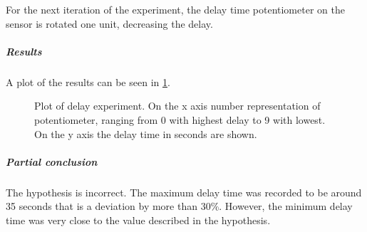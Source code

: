 For the next iteration of the experiment, the delay time potentiometer on the sensor
is rotated one unit, decreasing the delay.

\subparagraph{Results}

A plot of the results can be seen in \cref{fig:pir_delay}.

\begin{figure}[htbp]
\centering
{}
\caption[Delay experiment]{Plot of delay experiment. On the x axis number representation of potentiometer, ranging from 0 with highest delay to 9 with lowest. On the y axis the delay time in seconds are shown.}\label{fig:pir_delay}
\end{figure}

\subparagraph{Partial conclusion}

The hypothesis is incorrect. The maximum delay time was recorded to be
around 35 seconds that is a deviation by more than 30\%.
However, the minimum delay time was very close to the value
described in the hypothesis.
